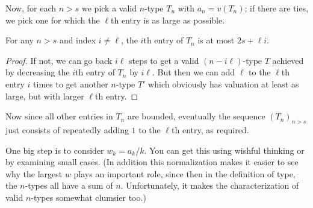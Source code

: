 \documentclass[11pt]{scrartcl}
\begin{document}
Now, for each $n > s$ we pick a valid $n$-type $T_n$
with $a_n = v(T_n)$;
if there are ties, we pick one for which the $\ell$th
entry is as large as possible.
\begin{claim*}
  For any $n > s$ and index $i \neq \ell$,
  the $i$th entry of $T_n$
  is at most $2s + \ell i$.
\end{claim*}
\begin{proof}
  If not, we can go back $i\ell$ steps to get
  a valid $(n-i\ell)$-type $T$
  achieved by decreasing the $i$th entry of $T_n$ by $i \ell$.
  But then we can add $\ell$ to the $\ell$th entry $i$
  times to get another $n$-type $T'$ which obviously
  has valuation at least as large,
  but with larger $\ell$th entry.
\end{proof}

Now since all other entries in $T_n$ are bounded,
eventually the sequence $(T_n)_{n > s}$
just consists of repeatedly
adding $1$ to the $\ell$th entry, as required.

\begin{remark*}
One big step is to consider $w_k = a_k / k$.
You can get this using wishful thinking
or by examining small cases.
(In addition this normalization makes it easier
to see why the largest $w$ plays an important role,
since then in the definition of type,
the $n$-types all have a sum of $n$.
Unfortunately, it makes the characterization
of valid $n$-types somewhat clumsier too.)
\end{remark*}
\pagebreak
\end{document}
